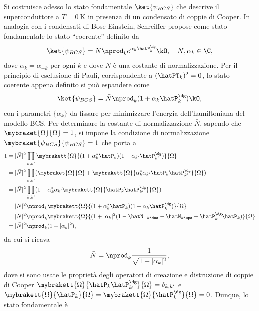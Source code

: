 Si costruisce adesso lo stato fondamentale $\ket{\psi_{BCS}}$ che descrive il superconduttore a $T = \SI{0}{\kelvin}$ in presenza di un condensato di coppie di Cooper. In analogia con i condensati di Bose-Einstein, Schreiffer propose come stato fondamentale lo stato ``coerente'' definito da
\begin{equation}
    \ket{\psi_{BCS}} = \bar{N}\nprod_k e^{\alpha_k\hatP_k^\dg}\kO,\quad \bar{N},\alpha_k \in \C,
\end{equation}
dove $\alpha_k = \alpha_{-k}$ per ogni $k$ e dove $\bar{N}$ è una costante di normalizzazione. Per il principio di esclusione di Pauli, corrispondente a $(\hatPT_k)^2 = 0$, lo stato coerente appena definito si può espandere come
\begin{equation}
    \ket{\psi_{BCS}} = \bar{N}\nprod_k(1 + \alpha_k\hatP_k^\dg)\kO,
\end{equation}
con i parametri $\{\alpha_k\}$ da fissare per minimizzare l'energia dell'hamiltoniana del modello BCS. Per determinare la costante di normalizzazione $\bar{N}$, sapendo che $\mybraket{\Omega}{\Omega} = 1$, si impone la condizione di normalizzazione $\mybraket{\psi_{BCS}}{\psi_{BCS}} = 1$ che porta a
\begin{equation}
    \begin{split}
        1 &= |\bar{N}|^2\prod_{k,k'}\mybrakett{\Omega}{(1 + \alpha_k^*\hatP_k)(1 + \alpha_{k'}\hatP_{k'}^\dg)}{\Omega} \\
        &= |\bar{N}|^2\prod_{k,k'}(\mybraket{\Omega}{\Omega} + \mybrakett{\Omega}{\alpha_k^*\alpha_{k'}\hatP_k\hatP_{k'}^\dg}{\Omega}) \\
        &= |\bar{N}|^2\prod_{k,k'}(1 + \alpha_k^*\alpha_{k'}\mybrakett{\Omega}{\hatP_k\hatP_{k'}^\dg}{\Omega}) \\
        &= |\bar{N}|^2\nprod_{k}\mybrakett{\Omega}{(1 + \alpha_k^*\hatP_k)(1 + \alpha_k\hatP_k^\dg)}{\Omega} \\
        &= |\bar{N}|^2\nprod_{k}\mybrakett{\Omega}{(1 + |\alpha_k|^2(1 - \hatN_{-k\doa} - \hatN_{k\upa} + \hatP_k^\dg\hatP_k)}{\Omega} \\
        &= |\bar{N}|^2\nprod_{k}(1 + |\alpha_k|^2),
    \end{split}
\end{equation}
da cui si ricava
\begin{equation}
    \bar{N} = \nprod_k\frac{1}{\sqrt{1 + |\alpha_k|^2}},
\end{equation}
dove si sono usate le proprietà degli operatori di creazione e distruzione di coppie di Cooper $\mybrakett{\Omega}{\hatP_{k}\hatP_{k'}^\dg}{\Omega} = \delta_{k,k'}$ e $\mybrakett{\Omega}{\hatP_k}{\Omega} = \mybrakett{\Omega}{\hatP_k^\dg}{\Omega} = 0$. Dunque, lo stato fondamentale è
